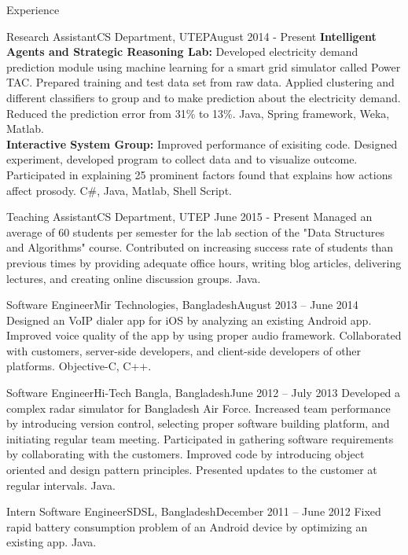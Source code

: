\documentclass[]{mcdowellcv}
\begin{document}
	\begin{cvsection}{Experience}
		
		\begin{cvsubsection}{Research Assistant}{CS Department, UTEP}{August 2014 - Present}
			\textbf{Intelligent Agents and Strategic Reasoning Lab:} Developed electricity demand prediction module using machine learning for a smart grid simulator called Power TAC. Prepared training and test data set from raw data. Applied clustering and different classifiers to group and to make prediction about the electricity demand. Reduced the prediction error from 31\% to 13\%. Java, Spring framework, Weka, Matlab.\\ 
			\textbf{Interactive System Group:} Improved performance of exisiting code. Designed experiment, developed program to collect data and to visualize outcome. Participated in explaining 25 prominent factors found that explains how actions affect prosody. C\#, Java, Matlab, Shell Script.
		\end{cvsubsection}
		
		\begin{cvsubsection}{Teaching Assistant}{CS Department, UTEP }{June 2015 - Present}
			Managed an average of 60 students per semester for the lab section of the "Data Structures and Algorithms" course. Contributed on increasing success rate of students than previous times by providing adequate office hours, writing blog articles, delivering lectures, and creating online discussion groups. Java.
		\end{cvsubsection}
		
		\begin{cvsubsection}{Software Engineer}{Mir Technologies, Bangladesh}{August 2013 -- June 2014}
		Designed an VoIP dialer app for iOS by analyzing an existing Android app. Improved voice quality of the app by using proper audio framework. Collaborated with customers, server-side developers, and client-side developers of other platforms. Objective-C, C++.
\end{cvsubsection}		
		\begin{cvsubsection}{Software Engineer}{Hi-Tech Bangla, Bangladesh}{June 2012 -- July 2013}	
Developed a complex radar simulator for Bangladesh Air Force. Increased team performance by introducing version control, selecting proper software building platform, and initiating regular team meeting. Participated in gathering software requirements by collaborating with the customers. Improved code by introducing object oriented and design pattern principles. Presented updates to the customer at regular intervals. Java.
		\end{cvsubsection}
		
		\begin{cvsubsection}{Intern Software Engineer}{SDSL, Bangladesh}{December 2011 -- June 2012}	
			Fixed rapid battery consumption problem of an Android device by optimizing an existing app. Java.
		\end{cvsubsection}		
	\end{cvsection}
	
\end{document}
